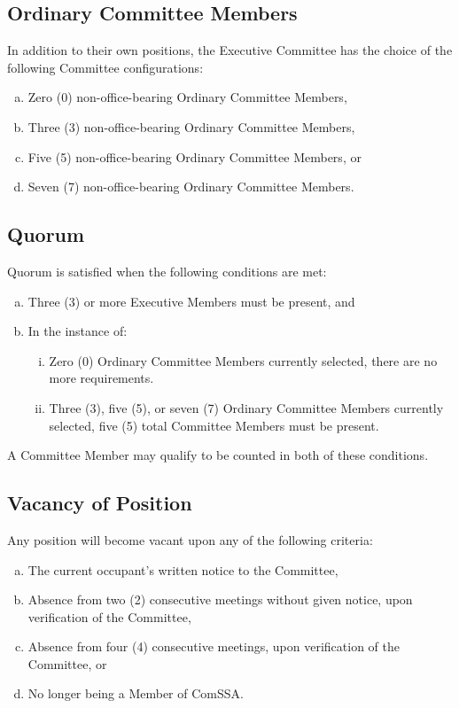 \documentclass[a4paper,12pt]{article}
\begin{document}
\subsection{Ordinary Committee Members}

In addition to their own positions, the Executive Committee has the choice of the following Committee configurations:

\begin{enumerate}[a)]
	\item Zero (0) non-office-bearing Ordinary Committee Members,
	\item Three (3) non-office-bearing Ordinary Committee Members,
	\item Five (5) non-office-bearing Ordinary Committee Members, or
	\item Seven (7) non-office-bearing Ordinary Committee Members.
\end{enumerate}

\subsection{Quorum}

Quorum is satisfied when the following conditions are met:

\begin{enumerate}[a)]
	\item Three (3) or more Executive Members must be present, and
	\item In the instance of:
	\begin{enumerate}[i)]
		\item Zero (0) Ordinary Committee Members currently selected, there are no more requirements.
		\item Three (3), five (5), or seven (7) Ordinary Committee Members currently selected, five (5) total Committee Members must be present.
	\end{enumerate}
\end{enumerate}

A Committee Member may qualify to be counted in both of these conditions.

\subsection{Vacancy of Position}

Any position will become vacant upon any of the following criteria:

\begin{enumerate}[a)]
	\item The current occupant's written notice to the Committee,
	\item Absence from two (2) consecutive meetings without given notice, upon verification of the Committee,
	\item Absence from four (4) consecutive meetings, upon verification of the Committee, or
	\item No longer being a Member of ComSSA.
\end{enumerate}
\end{document}
